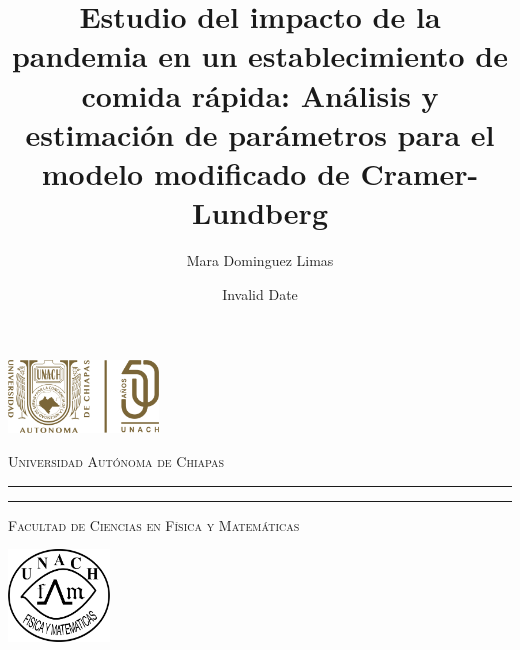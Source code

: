 \documentclass[
  us-letterpaper,
]{scrreprt}
\title{Estudio del impacto de la pandemia en un establecimiento de
comida rápida: Análisis y estimación de parámetros para el modelo
modificado de Cramer-Lundberg}
\author{Mara Dominguez Limas}
\date{Invalid Date}
\theoremstyle{plain}
\theoremstyle{plain}
\theoremstyle{definition}
\theoremstyle{remark}
\begin{document}
\begin{titlepage}
\hspace{-1.7cm} %
\begin{minipage}[t][0.03\textheight][c]{0.22\textwidth}
        \includegraphics[width=4.0cm]{FCFM-UNACH.png}
\end{minipage}\hspace{0.9cm}
\begin{minipage}[t][0.03\textheight][c]{0.69\textwidth}
\begin{center}
                \textsc{\huge Universidad Autónoma de Chiapas}\\[0.3cm]
                \hrule height 2.5pt
                \vspace{0.2cm}
                \hrule height1pt
                \vspace{0.3cm}
                \textsc{\Large Facultad de Ciencias en Física y Matemáticas}
\end{center}
\end{minipage}\hspace{0.2cm}
\begin{minipage}[t][0.03\textheight][c]{0.2\textwidth}
		\includegraphics[width=2.7cm]{logofcfm.png}
\end{minipage}\\
\begin{minipage}[t][0.93\textheight][c]{0.06\textwidth}
\vspace{60pt}
    \begin{center}
        \vrule width1pt height18cm
        \vspace{5mm}
        \vrule width2.5pt height18cm
        \vspace{5mm}
        \vrule width1pt height18cm
   \end{center}
\end{minipage}\hspace{1.3cm} 
\begin{minipage}[t][0.95\textheight][c]{0.76\textwidth}


\end{minipage}
\end{titlepage}
\end{document}
